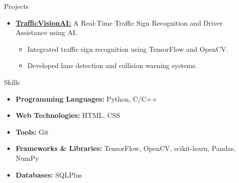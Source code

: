 \documentclass{resume} %
\begin{document}
\begin{rSection}{Projects}
\begin{itemize}
    \item{\href{https://github.com/mystichronicle/TrafficVisionAI}{{\bf TrafficVisionAI:}} 
    A Real-Time Traffic Sign Recognition and Driver Assistance using AI.\vspace{-2pt} 
    \begin{itemize}\setlength{\itemsep}{-2pt}
        \item Integrated traffic sign recognition using TensorFlow and OpenCV.
        \item Developed lane detection and collision warning systems.
    \end{itemize}}
    
\end{itemize}
\end{rSection}

\begin{rSection}{Skills}
\begin{itemize}\setlength{\itemsep}{-2pt}
    \item {\bf Programming Languages:} Python, C/C++
    \item {\bf Web Technologies:} HTML, CSS
    \item {\bf Tools:} Git
    \item {\bf Frameworks \& Libraries:} TensorFlow, OpenCV, scikit-learn, Pandas, NumPy
    \item {\bf Databases:} SQLPlus
\end{itemize}
\end{rSection}
\end{document}
